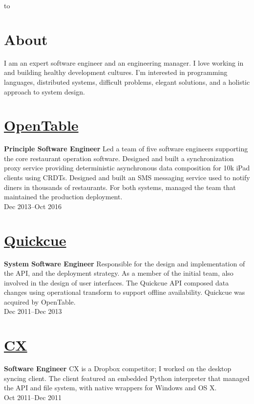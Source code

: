 \documentclass[margin]{res}
\begin{document}

\hbox to 

\begin{resume}
\section{About}

I am an expert software engineer and an engineering manager. I love
working in and building healthy development cultures. I'm interested
in programming languages, distributed systems, difficult problems,
elegant solutions, and a holistic approach to system design.

\section{\href{https://opentable.com/}{OpenTable}}
{\bf Principle Software Engineer}
%
Led a team of five software engineers supporting the core restaurant
operation software. Designed and built a synchronization proxy service
providing deterministic asynchronous data composition for 10k iPad
clients using CRDTs. Designed and built an SMS messaging service used
to notify diners in thousands of restaurants. For both systems,
managed the team that maintained the production deployment.\\
%
Dec 2013--Oct 2016

\section{\href{https://quickcue.com/}{Quickcue}}
{\bf System Software Engineer}
%
Responsible for the design and implementation of the API, and the
deployment strategy. As a member of the initial team, also involved in
the design of user interfaces. The Quickcue API composed data changes
using operational transform to support offline availability. Quickcue
was acquired by OpenTable.\\
%
Dec 2011--Dec 2013

\section{\href{https://www.cx.com/}{CX}}
{\bf Software Engineer}
%
CX is a Dropbox competitor; I worked on the desktop syncing client.
The client featured an embedded Python interpreter that managed the
API and file system, with native wrappers for Windows and OS X.\\
%
Oct 2011--Dec 2011


\end{resume}
\end{document}
